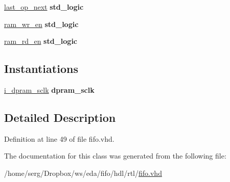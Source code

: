 \begin{DoxyCompactItemize}
\item 
\hyperlink{classfifo_1_1rtl_a9ef558ff5b27f438f6341bc9dd5dcb2d}{last\+\_\+op\+\_\+next} {\bfseries \textcolor{comment}{std\+\_\+logic}\textcolor{vhdlchar}{ }} \hypertarget{classfifo_1_1rtl_a9ef558ff5b27f438f6341bc9dd5dcb2d}{}\label{classfifo_1_1rtl_a9ef558ff5b27f438f6341bc9dd5dcb2d}

\item 
\hyperlink{classfifo_1_1rtl_a3c94cb70768bab8bcebb4db25c74b860}{ram\+\_\+wr\+\_\+en} {\bfseries \textcolor{comment}{std\+\_\+logic}\textcolor{vhdlchar}{ }} \hypertarget{classfifo_1_1rtl_a3c94cb70768bab8bcebb4db25c74b860}{}\label{classfifo_1_1rtl_a3c94cb70768bab8bcebb4db25c74b860}

\item 
\hyperlink{classfifo_1_1rtl_a4445071afa18b5a01aaebf6d36ab8864}{ram\+\_\+rd\+\_\+en} {\bfseries \textcolor{comment}{std\+\_\+logic}\textcolor{vhdlchar}{ }} \hypertarget{classfifo_1_1rtl_a4445071afa18b5a01aaebf6d36ab8864}{}\label{classfifo_1_1rtl_a4445071afa18b5a01aaebf6d36ab8864}

\end{DoxyCompactItemize}
\subsection*{Instantiations}
 \begin{DoxyCompactItemize}
\item 
\hyperlink{classfifo_1_1rtl_a8f5c7510fef1e0e01328e8fe7857281b}{i\+\_\+dpram\+\_\+sclk}  {\bfseries dpram\+\_\+sclk}   \hypertarget{classfifo_1_1rtl_a8f5c7510fef1e0e01328e8fe7857281b}{}\label{classfifo_1_1rtl_a8f5c7510fef1e0e01328e8fe7857281b}

\end{DoxyCompactItemize}


\subsection{Detailed Description}


Definition at line 49 of file fifo.\+vhd.



The documentation for this class was generated from the following file\+:\begin{DoxyCompactItemize}
\item 
/home/serg/\+Dropbox/ws/eda/fifo/hdl/rtl/\hyperlink{fifo_8vhd}{fifo.\+vhd}\end{DoxyCompactItemize}
